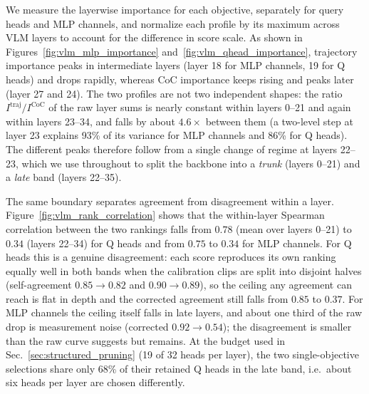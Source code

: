

We measure the layerwise importance for each objective, separately for query heads and MLP channels, and normalize each profile by its maximum across VLM layers to account for the difference in score scale. As shown in Figures~\ref{fig:vlm_mlp_importance} and~\ref{fig:vlm_qhead_importance}, trajectory importance peaks in intermediate layers (layer 18 for MLP channels, 19 for Q heads) and drops rapidly, whereas CoC importance keeps rising and peaks later (layer 27 and 24). The two profiles are not two independent shapes: the ratio $I^{\mathrm{traj}}/I^{\mathrm{CoC}}$ of the raw layer sums is nearly constant within layers 0--21 and again within layers 23--34, and falls by about $4.6\times$ between them (a two-level step at layer 23 explains 93\% of its variance for MLP channels and 86\% for Q heads). The different peaks therefore follow from a single change of regime at layers 22--23, which we use throughout to split the backbone into a \emph{trunk} (layers 0--21) and a \emph{late} band (layers 22--35).

The same boundary separates agreement from disagreement within a layer. Figure~\ref{fig:vlm_rank_correlation} shows that the within-layer Spearman correlation between the two rankings falls from $0.78$ (mean over layers 0--21) to $0.34$ (layers 22--34) for Q heads and from $0.75$ to $0.34$ for MLP channels. For Q heads this is a genuine disagreement: each score reproduces its own ranking equally well in both bands when the calibration clips are split into disjoint halves (self-agreement $0.85\!\to\!0.82$ and $0.90\!\to\!0.89$), so the ceiling any agreement can reach is flat in depth and the corrected agreement still falls from $0.85$ to $0.37$. For MLP channels the ceiling itself falls in late layers, and about one third of the raw drop is measurement noise (corrected $0.92\!\to\!0.54$); the disagreement is smaller than the raw curve suggests but remains. At the budget used in Sec.~\ref{sec:structured_pruning} (19 of 32 heads per layer), the two single-objective selections share only 68\% of their retained Q heads in the late band, i.e.\ about six heads per layer are chosen differently.

